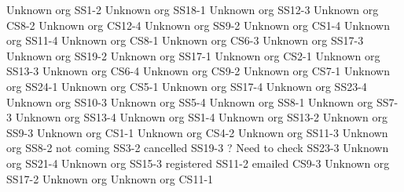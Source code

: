 \begin{multicols}{2}
{Unknown org}
{SS1-2}
{}
{Unknown org}
{SS18-1}
{}
{Unknown org}
{SS12-3}
{}
{Unknown org}
{CS8-2}
{}
{Unknown org}
{CS12-4}
{}
{Unknown org}
{SS9-2}
{}
{Unknown org}
{CS1-4}
{}
{Unknown org}
{SS11-4}
{}
{Unknown org}
{CS8-1}
{}
{Unknown org}
{CS6-3}
{}
{Unknown org}
{SS17-3}
{}
{Unknown org}
{SS19-2}
{}
{Unknown org}
{SS17-1}
{}
{Unknown org}
{CS2-1}
{}
{Unknown org}
{SS13-3}
{}
{Unknown org}
{CS6-4}
{}
{Unknown org}
{CS9-2}
{}
{Unknown org}
{CS7-1}
{}
{Unknown org}
{SS24-1}
{}
{Unknown org}
{CS5-1}
{}
{Unknown org}
{SS17-4}
{}
{Unknown org}
{SS23-4}
{}
{Unknown org}
{SS10-3}
{}
{Unknown org}
{SS5-4}
{}
{Unknown org}
{SS8-1}
{}
{Unknown org}
{SS7-3}
{}
{Unknown org}
{SS13-4}
{}
{Unknown org}
{SS1-4}
{}
{Unknown org}
{SS13-2}
{}
{Unknown org}
{SS9-3}
{}
{Unknown org}
{CS1-1}
{}
{Unknown org}
{CS4-2}
{}
{Unknown org}
{SS11-3}
{}
{Unknown org}
{SS8-2}
{}
{not coming}
{SS3-2}
{}
{cancelled}
{SS19-3}
{}
{? Need to check}
{SS23-3}
{}
{Unknown org}
{SS21-4}
{}
{Unknown org}
{SS15-3}
{}
{registered}
{SS11-2}
{}
{emailed}
{CS9-3}
{}
{Unknown org}
{SS17-2}
{}
{Unknown org}
{}
{}
{Unknown org}
{CS11-1}
{}
\end{multicols}

